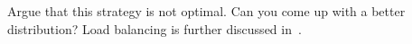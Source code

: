   Argue that this strategy is not optimal. Can you come up with a
  better distribution?
  Load balancing is further discussed in~.
